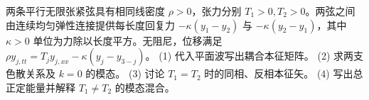 两条平行无限张紧弦具有相同线密度 \(\rho>0\)，张力分别 \(T_1>0,T_2>0\)。两弦之间由连续均匀弹性连接提供每长度回复力 \(-\kappa(y_1-y_2)\) 与 \(-\kappa(y_2-y_1)\)，其中 \(\kappa>0\) 单位为力除以长度平方。无阻尼，位移满足 \(\rho y_{j,tt}=T_j y_{j,xx}-\kappa(y_j-y_{3-j})\)。
(1) 代入平面波写出耦合本征矩阵。
(2) 求两支色散关系及 \(k=0\) 的模态。
(3) 讨论 \(T_1=T_2\) 时的同相、反相本征矢。
(4) 写出总正定能量并解释 \(T_1\ne T_2\) 的模态混合。
